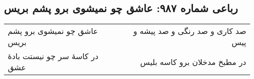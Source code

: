 \begin{center}
\section*{رباعی شماره ۹۸۷: عاشق چو نمیشوی برو پشم بریس}
\label{sec:0987}
\begin{longtable}{l p{0.5cm} r}
عاشق چو نمیشوی برو پشم بریس
&&
صد کاری و صد رنگی و صد پیشه و پیس
\\
در کاسهٔ سر چو نیستت بادهٔ عشق
&&
در مطبخ مدخلان برو کاسه بلیس
\\
\end{longtable}
\end{center}
